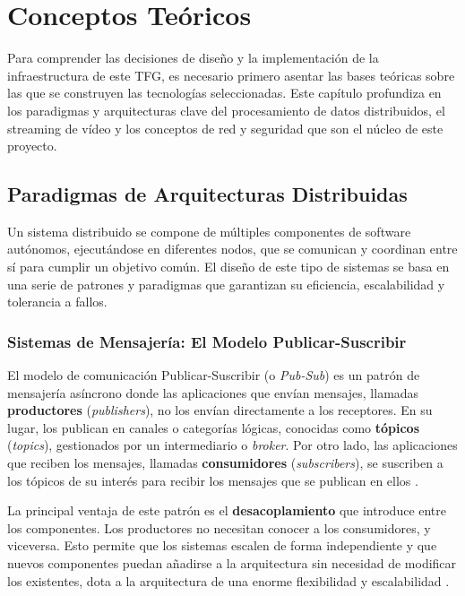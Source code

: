 \chapter{Conceptos Teóricos}
\label{chap:conceptos}

Para comprender las decisiones de diseño y la implementación de la infraestructura de este TFG, es necesario primero asentar las bases teóricas sobre las que se construyen las tecnologías seleccionadas. Este capítulo profundiza en los paradigmas y arquitecturas clave del procesamiento de datos distribuidos, el streaming de vídeo y los conceptos de red y seguridad que son el núcleo de este proyecto.

\section{Paradigmas de Arquitecturas Distribuidas}
\label{sec:conceptos_arquitecturas}
Un sistema distribuido se compone de múltiples componentes de software autónomos, ejecutándose en diferentes nodos, que se comunican y coordinan entre sí para cumplir un objetivo común. El diseño de este tipo de sistemas se basa en una serie de patrones y paradigmas que garantizan su eficiencia, escalabilidad y tolerancia a fallos.

\subsection{Sistemas de Mensajería: El Modelo Publicar-Suscribir}
El modelo de comunicación Publicar-Suscribir (o \textit{Pub-Sub}) es un patrón de mensajería asíncrono donde las aplicaciones que envían mensajes, llamadas \textbf{productores} (\textit{publishers}), no los envían directamente a los receptores. En su lugar, los publican en canales o categorías lógicas, conocidas como \textbf{tópicos} (\textit{topics}), gestionados por un intermediario o \textit{broker}. Por otro lado, las aplicaciones que reciben los mensajes, llamadas \textbf{consumidores} (\textit{subscribers}), se suscriben a los tópicos de su interés para recibir los mensajes que se publican en ellos \cite{birman2007guide}.

La principal ventaja de este patrón es el \textbf{desacoplamiento} que introduce entre los componentes. Los productores no necesitan conocer a los consumidores, y viceversa. Esto permite que los sistemas escalen de forma independiente y que nuevos componentes puedan añadirse a la arquitectura sin necesidad de modificar los existentes, dota a la arquitectura de una enorme flexibilidad y escalabilidad \cite{kleppmann2017designing}.

